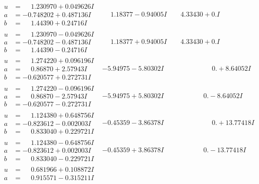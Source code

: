 \documentclass[1p]{elsarticle_modified}
\theoremstyle{definition}
\begin{document}
$$\begin{array}{c|c|c}
\begin{aligned}
u &= \phantom{-}1.230970 + 0.049626 I \\
a &= -0.748202 + 0.487136 I \\
b &= \phantom{-}1.44390 + 0.24716 I\end{aligned}
 & \phantom{-}1.18377 - 0.94005 I & \phantom{-}4.33430 + 0. I\phantom{ +0.000000I} \\ \hline\begin{aligned}
u &= \phantom{-}1.230970 - 0.049626 I \\
a &= -0.748202 - 0.487136 I \\
b &= \phantom{-}1.44390 - 0.24716 I\end{aligned}
 & \phantom{-}1.18377 + 0.94005 I & \phantom{-}4.33430 + 0. I\phantom{ +0.000000I} \\ \hline\begin{aligned}
u &= \phantom{-}1.274220 + 0.096196 I \\
a &= \phantom{-}0.86870 + 2.57943 I \\
b &= -0.620577 + 0.272731 I\end{aligned}
 & -5.94975 - 5.80302 I & \phantom{-0.000000 -}0. + 8.64052 I \\ \hline\begin{aligned}
u &= \phantom{-}1.274220 - 0.096196 I \\
a &= \phantom{-}0.86870 - 2.57943 I \\
b &= -0.620577 - 0.272731 I\end{aligned}
 & -5.94975 + 5.80302 I & \phantom{-0.000000 } 0. - 8.64052 I \\ \hline\begin{aligned}
u &= \phantom{-}1.124380 + 0.648756 I \\
a &= -0.823612 - 0.002003 I \\
b &= \phantom{-}0.833040 + 0.229721 I\end{aligned}
 & -0.45359 - 3.86378 I & \phantom{-0.000000 -}0. + 13.77418 I \\ \hline\begin{aligned}
u &= \phantom{-}1.124380 - 0.648756 I \\
a &= -0.823612 + 0.002003 I \\
b &= \phantom{-}0.833040 - 0.229721 I\end{aligned}
 & -0.45359 + 3.86378 I & \phantom{-0.000000 } 0. - 13.77418 I \\ \hline\begin{aligned}
u &= \phantom{-}0.681966 + 0.108872 I \\
a &= \phantom{-}0.915571 - 0.315211 I \\

\end{aligned}
\end{array}$$
\end{document}
